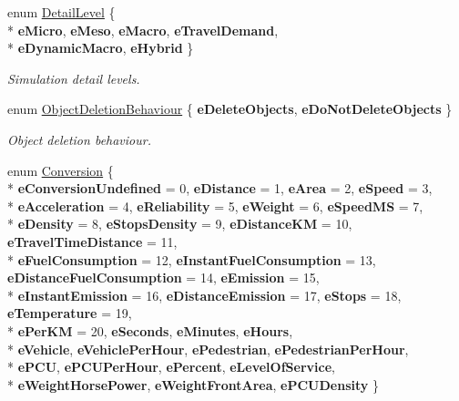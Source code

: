 \begin{DoxyCompactItemize}
\item 
enum \hyperlink{namespaceGK_a5ddba301910be36598d8c4261a94b93f}{Detail\+Level} \{ \\*
{\bfseries e\+Micro}, 
{\bfseries e\+Meso}, 
{\bfseries e\+Macro}, 
{\bfseries e\+Travel\+Demand}, 
\\*
{\bfseries e\+Dynamic\+Macro}, 
{\bfseries e\+Hybrid}
 \}\hypertarget{namespaceGK_a5ddba301910be36598d8c4261a94b93f}{}\label{namespaceGK_a5ddba301910be36598d8c4261a94b93f}
\begin{DoxyCompactList}\small\item\em Simulation detail levels. \end{DoxyCompactList}
\item 
enum \hyperlink{namespaceGK_a2f01756bc0253f960ed9e75b00638fd3}{Object\+Deletion\+Behaviour} \{ {\bfseries e\+Delete\+Objects}, 
{\bfseries e\+Do\+Not\+Delete\+Objects}
 \}\hypertarget{namespaceGK_a2f01756bc0253f960ed9e75b00638fd3}{}\label{namespaceGK_a2f01756bc0253f960ed9e75b00638fd3}
\begin{DoxyCompactList}\small\item\em Object deletion behaviour. \end{DoxyCompactList}
\item 
enum \hyperlink{namespaceGK_a3a072c41e7de00bafcfa83c9ce7fe760}{Conversion} \{ \\*
{\bfseries e\+Conversion\+Undefined} = 0, 
{\bfseries e\+Distance} = 1, 
{\bfseries e\+Area} = 2, 
{\bfseries e\+Speed} = 3, 
\\*
{\bfseries e\+Acceleration} = 4, 
{\bfseries e\+Reliability} = 5, 
{\bfseries e\+Weight} = 6, 
{\bfseries e\+Speed\+MS} = 7, 
\\*
{\bfseries e\+Density} = 8, 
{\bfseries e\+Stops\+Density} = 9, 
{\bfseries e\+Distance\+KM} = 10, 
{\bfseries e\+Travel\+Time\+Distance} = 11, 
\\*
{\bfseries e\+Fuel\+Consumption} = 12, 
{\bfseries e\+Instant\+Fuel\+Consumption} = 13, 
{\bfseries e\+Distance\+Fuel\+Consumption} = 14, 
{\bfseries e\+Emission} = 15, 
\\*
{\bfseries e\+Instant\+Emission} = 16, 
{\bfseries e\+Distance\+Emission} = 17, 
{\bfseries e\+Stops} = 18, 
{\bfseries e\+Temperature} = 19, 
\\*
{\bfseries e\+Per\+KM} = 20, 
{\bfseries e\+Seconds}, 
{\bfseries e\+Minutes}, 
{\bfseries e\+Hours}, 
\\*
{\bfseries e\+Vehicle}, 
{\bfseries e\+Vehicle\+Per\+Hour}, 
{\bfseries e\+Pedestrian}, 
{\bfseries e\+Pedestrian\+Per\+Hour}, 
\\*
{\bfseries e\+P\+CU}, 
{\bfseries e\+P\+C\+U\+Per\+Hour}, 
{\bfseries e\+Percent}, 
{\bfseries e\+Level\+Of\+Service}, 
\\*
{\bfseries e\+Weight\+Horse\+Power}, 
{\bfseries e\+Weight\+Front\+Area}, 
{\bfseries e\+P\+C\+U\+Density}
 \}
\end{DoxyCompactItemize}
